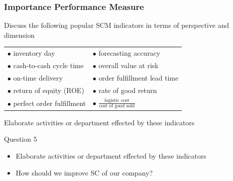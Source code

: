 \documentclass[10pt,handout,notes=show]{beamer}
\begin{document}
\begin{frame}
  \frametitle{Importance Performance Measure }

  \NextHalfLine
  Discuss the following popular SCM indicators in terms of perspective and dimension\\
  \begin{block}{}{}{}
    \begin{tabular}{ll}
      $\bullet$ inventory day                       & $\bullet$ forecasting accuracy   \\
      $\bullet$ cash-to-cash cycle time             & $\bullet$ overall value at risk      \\
      $\bullet$ on-time delivery                    & $\bullet$ order fulfillment lead time \\
      $\bullet$ return of equity (ROE)              & $\bullet$ rate of good return \\
      $\bullet$ perfect order fulfillment \hskip5ex & $\bullet$ $\frac{\mbox{logistic cost}}{\mbox{cost of good sold}}$ \\
    \end{tabular}
  \end{block}

  Elaborate activities or department effected by these indicators
  \begin{alertblock}{\small{Question 5}}{}
    \begin{itemize}
      \item Elaborate activities or department effected by these indicators
      \item How should we improve SC of our company?  \hfill \hyperlink{improve}{}
    \end{itemize}
  \end{alertblock}

\end{frame}
\end{document}
